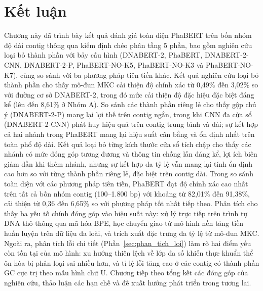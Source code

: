 \section{Kết luận}
\label{sec:ket_luan_c4}

Chương này đã trình bày kết quả đánh giá toàn diện PhaBERT trên bốn nhóm độ dài contig thông qua kiểm định chéo phân tầng 5 phần, bao gồm nghiên cứu loại bỏ thành phần với bảy cấu hình (DNABERT-2, PhaBERT, DNABERT-2-CNN, DNABERT-2-P, PhaBERT-NO-K5, PhaBERT-NO-K3 và PhaBERT-NO-K7), cùng so sánh với ba phương pháp tiên tiến khác. Kết quả nghiên cứu loại bỏ thành phần cho thấy mô-đun MKC cải thiện độ chính xác từ 0,49\% đến 3,02\% so với đường cơ sở DNABERT-2, trong đó mức cải thiện độ đặc hiệu đặc biệt đáng kể (lên đến 8,61\% ở Nhóm A). So sánh các thành phần riêng lẻ cho thấy gộp chú ý (DNABERT-2-P) mang lại lợi thế trên contig ngắn, trong khi CNN đa cửa sổ (DNABERT-2-CNN) phát huy hiệu quả trên contig trung bình và dài; sự kết hợp cả hai nhánh trong PhaBERT mang lại hiệu suất cân bằng và ổn định nhất trên toàn phổ độ dài. Kết quả loại bỏ từng kích thước cửa sổ tích chập cho thấy các nhánh có mức đóng góp tương đương và thông tin chồng lấn đáng kể, lợi ích biên giảm dần khi thêm nhánh, nhưng sự kết hợp đa tỷ lệ vẫn mang lại tính ổn định cao hơn so với từng thành phần riêng lẻ, đặc biệt trên contig dài. Trong so sánh toàn diện với các phương pháp tiên tiến, PhaBERT đạt độ chính xác cao nhất trên tất cả bốn nhóm contig (100--1.800 bp) với khoảng từ 82,01\% đến 91,38\%, cải thiện từ 0,36 đến 6,65\% so với phương pháp tốt nhất tiếp theo. Phân tích cho thấy ba yếu tố chính đóng góp vào hiệu suất này: xử lý trực tiếp trên trình tự DNA thô thông qua mã hóa BPE, học chuyển giao từ mô hình nền tảng tiền huấn luyện trên dữ liệu đa loài, và trích xuất đặc trưng đa tỷ lệ từ mô-đun MKC. Ngoài ra, phân tích lỗi chi tiết (Phần~\ref{sec:phan_tich_loi}) làm rõ hai điểm yếu còn tồn tại của mô hình: xu hướng thiên lệch về lớp đa số khiến thực khuẩn thể ôn hòa bị phân loại sai nhiều hơn, và tỉ lệ lỗi tăng cao ở các contig có thành phần GC cực trị theo mẫu hình chữ U. Chương tiếp theo tổng kết các đóng góp của nghiên cứu, thảo luận các hạn chế và đề xuất hướng phát triển trong tương lai.